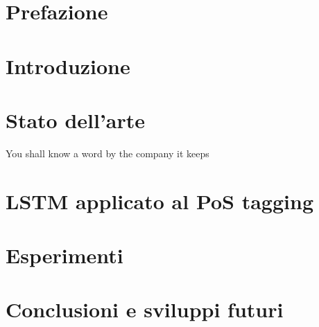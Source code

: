 \documentclass[final,a4paper,12pt]{report}
\begin{document}


\chapter*{Prefazione}



\clearpage



\chapter {Introduzione}\label{chap:chap_1}


\chapter {Stato dell'arte}\label{chap:chap_2}


\begin{savequote}[45mm]
  You shall know a word by the company it keeps
\end{savequote}
\chapter {LSTM applicato al PoS tagging}\label{chap:chap_3}


\chapter {Esperimenti}\label{chap:chap_4}


\chapter*{Conclusioni e sviluppi futuri}






%
\clearpage
\vspace*{6cm}

\end{document}
